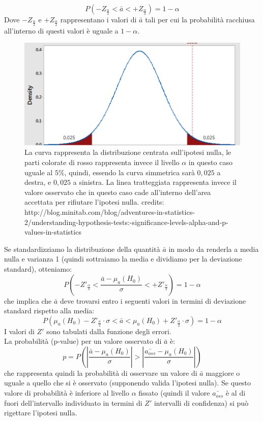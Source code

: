 \documentclass[]{article}
\begin{document}
\begin{equation}
P(-Z_{\frac{\alpha}{2}}< \bar{a} < +Z_{\frac{\alpha}{2}}) = 1 - \alpha
\end{equation}
Dove $-Z_{\frac{\alpha}{2}}$ e $+Z_{\frac{\alpha}{2}}$ rappresentano i valori di $\bar{a}$ tali per cui la probabilità racchiusa all'interno di questi valori è uguale a $1-\alpha$. 
\begin{figure}
\centering
\includegraphics[scale= 0.3]{Immagini/distro-pvalue.png}
\caption{La curva rappresenta la distribuzione centrata sull'ipotesi nulla, le parti colorate di rosso rappresenta invece il livello $\alpha$ in questo caso uguale al $5\%$, quindi, essendo la curva simmetrica sarà $0,025$ a destra, e $0,025$ a sinistra. La linea tratteggiata rappresenta invece il valore osservato che in questo caso cade all'interno dell'area accettata per rifiutare l'ipotesi nulla.
credits: http://blog.minitab.com/blog/adventures-in-statistics-2/understanding-hypothesis-tests:-significance-levels-alpha-and-p-values-in-statistics}
\label{fig: distro-pvalue}
\end{figure}
Se standardizziamo la distribuzione della quantità $\bar{a}$ in modo da renderla a media nulla e varianza 1 (quindi sottraiamo la media e dividiamo per la deviazione standard), otteniamo:
\begin{equation}
P\left(-Z'_{\frac{\alpha}{2}}< \frac{\bar{a} - \mu_a(H_0)}{\sigma} < +Z'_{\frac{\alpha}{2}}\right) = 1 - \alpha
\end{equation}
che implica che $\bar{a}$ deve trovarsi entro i seguenti valori in termini di deviazione standard rispetto alla media:
\begin{equation}
\label{eq: prob-interna}
P\left(\mu_a(H_0) - Z'_{\frac{\alpha}{2}} \cdot \sigma < \bar{a} < \mu_a(H_0) + Z'_{\frac{\alpha}{2}} \cdot \sigma \right) = 1 - \alpha
\end{equation}
I valori di $Z'$ sono tabulati dalla funzione degli errori.\\
La probabilità (p-value) per un valore osservato di $\bar{a}$ è:
\begin{equation}
p = P\left( \left| \frac{\bar{a} - \mu_a(H_0)}{\sigma} \right| > \left| \frac{\bar{a_{oss}} - \mu_a(H_0)}{\sigma} \right| \right)
\end{equation}
che rappresenta quindi la probabilità di osservare un valore di $\bar{a}$ maggiore o uguale a quello che si è osservato (supponendo valida l'ipotesi nulla). Se questo valore di probabilità è inferiore al livello $\alpha$ fissato (quindi il valore $\bar{a_{oss}}$ è al di fuori dell'intervallo individuato in termini di $Z'$ intervalli di confidenza) si può rigettare l'ipotesi nulla.
\end{document}
